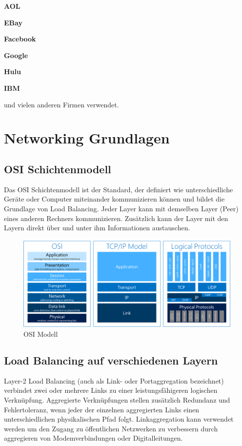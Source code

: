 \textbf{AOL}

\textbf{EBay}

\textbf{Facebook}

\textbf{Google}

\textbf{Hulu}

\textbf{IBM}

und vielen anderen Firmen verwendet.

\section{Networking Grundlagen}
\label{sec:Networking Grundlagen}

\subsection{OSI Schichtenmodell}
\label{sec:OSI Schichtenmodell}
Das OSI Schichtenmodell ist der Standard, der definiert wie unterschiedliche Geräte oder Computer miteinander kommunizieren können und bildet die Grundlage von Load Balancing. Jeder Layer kann mit demselben Layer (Peer) eines anderen Rechners kommunizieren. Zusätzlich kann der Layer mit den Layern direkt über und unter ihm Informationen austauschen. \cite{LoadBalancing2}

\begin{figure}[!h]
	\begin{center}
		\includegraphics[width=0.8\linewidth]{images/loadbalancing3.jpg}
		\caption{OSI Modell \cite{LoadBalancingGrafik2}}
		\label{OSI Modell}
	\end{center}
\end{figure}

\subsection{Load Balancing auf verschiedenen Layern}
\label{sec:Load Balancing auf verschiedenen Layern}
Layer-2 Load Balancing (auch als Link- oder Portaggregation bezeichnet) verbindet zwei oder mehrere Links zu einer leistungsfähigeren logischen Verknüpfung. Aggregierte Verknüpfungen stellen zusätzlich Redundanz und Fehlertoleranz, wenn jeder der einzelnen aggregierten Links einen unterschiedlichen physikalischen Pfad folgt. Linkaggregation kann verwendet werden um den Zugang zu öffentlichen Netzwerken zu verbessern durch aggregieren von Modemverbindungen oder Digitalleitungen. 

